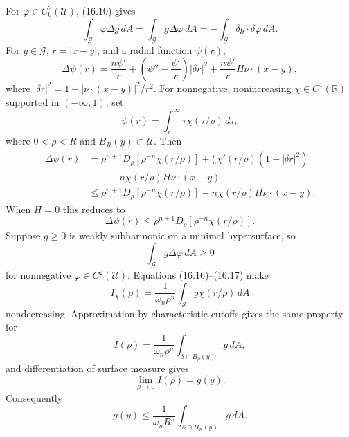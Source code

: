 For $\varphi\in C_0^2(\mathcal U)$, (16.10) gives
\begin{equation}
\int_{\mathcal G}\varphi\Delta g\,dA
=\int_{\mathcal G}g\Delta\varphi\,dA
=-\int_{\mathcal G}\delta g\cdot\delta\varphi\,dA.
\tag{16.13}
\end{equation}
For $y\in\mathcal G$, $r=|x-y|$, and a radial function $\psi(r)$,
\begin{equation}
\Delta\psi(r)=\frac{n\psi'}r
+\left(\psi''-\frac{\psi'}r\right)|\delta r|^2
+\frac{n\psi'}rH\nu\cdot(x-y),
\tag{16.14}
\end{equation}
where $|\delta r|^2=1-|\nu\cdot(x-y)|^2/r^2$.  For nonnegative,
nonincreasing $\chi\in C^1(\mathbb R)$ supported in $(-\infty,1)$, set
\[
\psi(r)=\int_r^\infty\tau\chi(\tau/\rho)\,d\tau,
\]
where $0<\rho<R$ and $B_R(y)\subset\mathcal U$.  Then
\begin{equation}
\begin{aligned}
\Delta\psi(r)
&=\rho^{n+1}D_\rho[\rho^{-n}\chi(r/\rho)]
+\frac r\rho\chi'(r/\rho)(1-|\delta r|^2)\\
&\qquad-n\chi(r/\rho)H\nu\cdot(x-y)\\
&\le\rho^{n+1}D_\rho[\rho^{-n}\chi(r/\rho)]
-n\chi(r/\rho)H\nu\cdot(x-y).
\end{aligned}
\tag{16.15}
\end{equation}
When $H=0$ this reduces to
\begin{equation}
\Delta\psi(r)\le\rho^{n+1}D_\rho[\rho^{-n}\chi(r/\rho)].
\tag{16.16}
\end{equation}
Suppose $g\ge0$ is weakly subharmonic on a minimal hypersurface, so
\begin{equation}
\int_\mathcal Gg\Delta\varphi\,dA\ge0
\tag{16.17}
\end{equation}
for nonnegative $\varphi\in C_0^2(\mathcal U)$.  Equations (16.16)--(16.17)
make
\begin{equation}
I_\chi(\rho)=\frac1{\omega_n\rho^n}
\int_\mathcal Sg\chi(r/\rho)\,dA
\tag{16.18}
\end{equation}
nondecreasing.  Approximation by characteristic cutoffs gives the same property
for
\begin{equation}
I(\rho)=\frac1{\omega_n\rho^n}
\int_{\mathcal S\cap B_\rho(y)}g\,dA,
\tag{16.19}
\end{equation}
and differentiation of surface measure gives
\begin{equation}
\lim_{\rho\to0}I(\rho)=g(y).
\tag{16.20}
\end{equation}
Consequently
\begin{equation}
g(y)\le\frac1{\omega_nR^n}
\int_{\mathcal S\cap B_R(y)}g\,dA.
\tag{16.21}
\end{equation}

